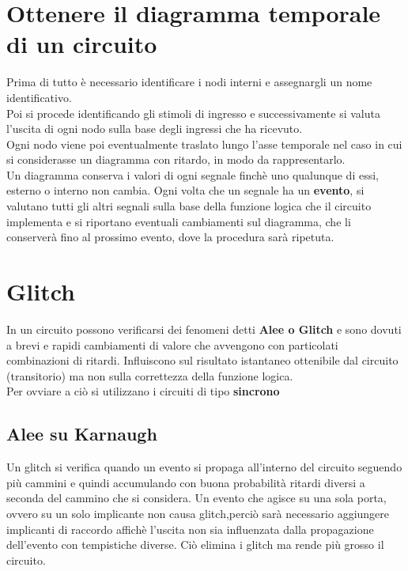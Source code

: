 \documentclass[a4paper]{book}
\begin{document}
\section{Ottenere il diagramma temporale di un circuito}

Prima di tutto è necessario identificare i nodi interni e assegnargli un nome identificativo.\\
Poi si procede identificando gli stimoli di ingresso e successivamente si valuta l'uscita di ogni nodo sulla base degli ingressi che ha ricevuto.\\
Ogni nodo viene poi eventualmente traslato lungo l'asse temporale nel caso in cui si considerasse un diagramma con ritardo, in modo da rappresentarlo.\\
Un diagramma conserva i valori di ogni segnale finchè uno qualunque di essi, esterno o interno non cambia.
Ogni volta che un segnale ha un \textbf{evento}, si valutano tutti gli altri segnali sulla base della funzione logica che il circuito implementa e si riportano eventuali cambiamenti sul diagramma, che li conserverà fino al prossimo evento, dove la procedura sarà ripetuta.


\section{Glitch}

In un circuito possono verificarsi dei fenomeni detti \textbf{Alee o Glitch} e sono dovuti a brevi e rapidi cambiamenti di valore che avvengono con particolati combinazioni di ritardi. Influiscono sul risultato istantaneo ottenibile dal circuito (transitorio) ma non sulla correttezza della funzione logica.\\
Per ovviare a ciò si utilizzano i circuiti di tipo \textbf{sincrono}

\subsection{Alee su Karnaugh}

Un glitch si verifica quando un evento si propaga all'interno del circuito seguendo più cammini e quindi accumulando con buona probabilità ritardi diversi a seconda del cammino che si considera.
Un evento che agisce su una sola porta, ovvero su un solo implicante non causa glitch,perciò sarà necessario aggiungere implicanti di raccordo affichè l'uscita non sia influenzata dalla propagazione dell'evento con tempistiche diverse.
Ciò elimina i glitch ma rende più grosso il circuito.
\end{document}
